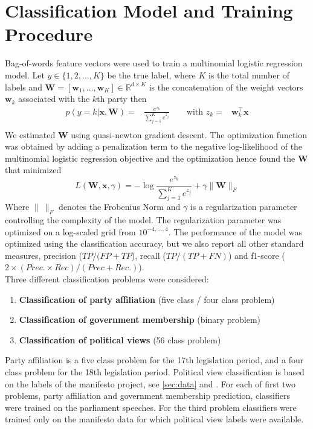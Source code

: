 \documentclass{article}
\renewcommand{\vec}[1]{\mathbf{#1}}
\newcommand{\R}{\mathds{R}}
\begin{document}
\section{Classification Model and Training Procedure}\label{sec:model}
Bag-of-words feature vectors were used to train a multinomial logistic regression model. Let $y\in\{1,2,\dots,K\}$ be the true  label, where $K$ is the total number of labels and $\vec{W}=[\vec{w}_1,\dots,\vec{w}_K]\in\R^{d\times K}$ is the concatenation of the weight vectors $\vec{w}_k$ associated with the $k$th party then 
\begin{eqnarray}\label{eq:logreg_multiclass}
p(y=k|\vec{x},\vec{W}) = &\frac{e^{z_k}}{\sum_{j=1}^K e^{z_j}} \qquad \textrm{with }  z_k=&\vec{w}_k^{\top}\vec{x} \\\nonumber
\end{eqnarray}
%
We estimated $\vec{W}$ using quasi-newton gradient descent. The optimization function was obtained by adding a penalization term to the negative log-likelihood of the multinomial logistic regression objective and the optimization hence found the $\vec{W}$ that minimized
\begin{equation}\label{eq:objective}
L(\vec{W}, \vec{x}, \gamma) = - \log{\frac{e^{z_k}}{\sum_{j=1}^K e^{z_j}}}+ \gamma \| \vec{W} \|_{F}
\end{equation}
Where $\|~\|_F$ denotes the Frobenius Norm and $\gamma$ is a regularization parameter controlling the complexity of the model. 
The regularization parameter was optimized on a log-scaled grid from $10^{-4,\dots,4}$. The performance of the model was optimized using the classification accuracy, but we also report all other standard measures, precision ($TP / (FP + TP$), recall ($TP / (TP + FN)$) and f1-score ($2\times (Prec. \times Rec) / (Prec + Rec.)$). \\

Three different classification problems were considered: 
\begin{enumerate}
\item {\bf Classification of party affiliation} (five class / four class problem)
\item {\bf Classification of government membership} (binary problem)
\item {\bf Classification of political views} (56 class problem)
\end{enumerate}

Party affiliation is a five class problem for the 17th legislation period, and a four class problem for the 18th legislation period. Political view classification is based on the labels of the manifesto project, see \autoref{sec:data} and \cite{leftright}. 
For each of first two problems, party affiliation and government membership prediction, classifiers were trained on the parliament speeches. For the third problem classifiers were trained only on the manifesto data for which political view labels were available. 
\end{document}
